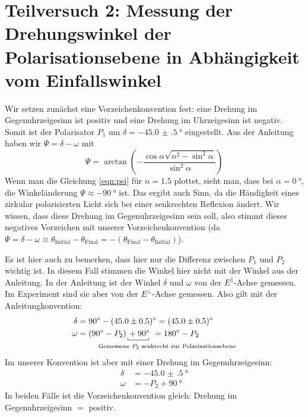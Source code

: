 \section{Teilversuch 2: Messung der Drehungswinkel der Polarisationsebene in Abhängigkeit vom Einfallswinkel}
	Wir setzen zunächst eine Vorzeichenkonvention fest: eine Drehung im Gegenuhrzeigesinn ist positiv und eine Drehung im Uhrzeigesinn ist negativ. Somit ist der Polarisator $P_1$ um $\delta = \SI{-45.0(5)}{\degree}$ eingestellt. Aus der Anleitung haben wir $\Psi = \delta - \omega$ mit 
	\begin{equation}
		\label{eqn:psi}
		\Psi = \arctan \left(- \frac{\cos\alpha \sqrt{n^2-\sin^2\alpha}}{\sin^2\alpha} \right)
	\end{equation}
	Wenn man die Gleichung \eqref{eqn:psi} für $n=\num{1.5}$ plottet, sieht man, dass bei $\alpha = \SI{0}{\degree}$, die Winkeländerung $\Psi \approx \SI{-90}{\degree}$ ist. Das ergibt auch Sinn, da die Händigkeit eines zirkular polarisierten Licht sich bei einer senkrechten Reflexion ändert. Wir wissen, dass diese Drehung im Gegenuhrzeigesinn sein soll, also stimmt dieses negatives Vorzeichen mit unserer Vorzeichenkonvention (da $\Psi = \delta - \omega \equiv \theta_\text{Initial} - \theta_\text{Final} = - (\theta_\text{Final} - \theta_\text{Initial})$). 

	Es ist hier auch zu bemerken, dass hier nur die Differenz zwischen $P_1$ und $P_2$ wichtig ist. In diesem Fall stimmen die Winkel hier nicht mit der Winkel aus der Anleitung. In der Anleitung ist der Winkel $\delta$ und $\omega$ von der $E^\parallel$-Achse gemessen. Im Experiment sind sie aber von der $E^\bot$-Achse gemessen. Also gilt mit der Anleitungkonvention:
	\begin{align}
		\delta &=  \SI{90}{\degree} - \SI{45.0(5)}{\degree} = \SI{45.0(5)}{\degree} \\ 
		\omega &=  (\SI{90}{\degree} - P_2)\,\brc{ + \SI{90}{\degree}~}{} = \SI{180}{\degree} - P_2 \\[-1em]
		&\phantom{=  \SI{90}{\degree}}\text{\scriptsize Gemessene $P_2$ senkrecht zur Polarisationsebene} \notag
	\end{align} 
	Im unserer Konvention ist aber mit einer Drehung im Gegenuhrzeigesinn:
	\begin{align}
		\delta &=  \SI{-45.0(5)}{\degree}\\ 
		\omega &=  -P_2 + \SI{90}{\degree}
	\end{align}
	In beiden Fälle ist die Vorzeichenkonvention gleich: Drehung im Gegenuhrzeigesinn $ = $ positiv.

